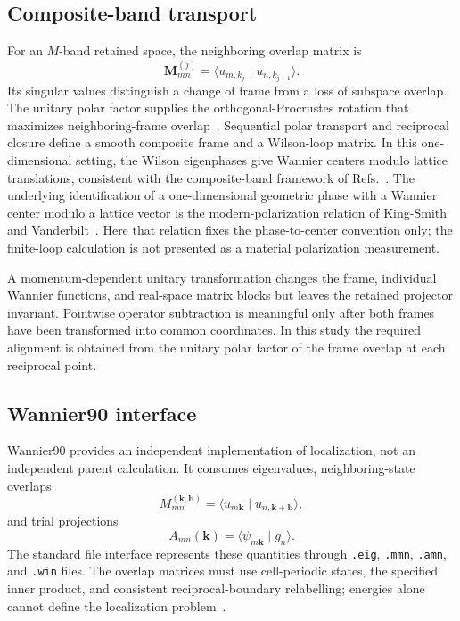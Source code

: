 \subsection{Composite-band transport}

For an $M$-band retained space, the neighboring overlap matrix is
\begin{equation}
    \mathbf M^{(j)}_{mn}
    =\langle u_{m,k_j}\mid u_{n,k_{j+1}}\rangle.
    \label{eq:periodic-1d-neighbor-overlap}
\end{equation}
Its singular values distinguish a change of frame from a loss of subspace
overlap. The unitary polar factor supplies the orthogonal-Procrustes rotation
that maximizes neighboring-frame overlap~\cite{schonemann1966}. Sequential
polar transport and reciprocal closure define a smooth composite frame and a
Wilson-loop matrix. In this one-dimensional setting, the Wilson eigenphases
give Wannier centers modulo lattice translations, consistent with the
composite-band framework of
Refs.~\cite{marzari1997,souza2001}. The underlying identification of a
one-dimensional geometric phase with a Wannier center modulo a lattice vector
is the modern-polarization relation of King-Smith and
Vanderbilt~\cite{kingsmith1993}. Here that relation fixes the phase-to-center
convention only; the finite-loop calculation is not presented as a material
polarization measurement.

A momentum-dependent unitary transformation changes the frame, individual
Wannier functions, and real-space matrix blocks but leaves the retained
projector invariant. Pointwise operator subtraction is meaningful only after
both frames have been transformed into common coordinates. In this study the
required alignment is obtained from the unitary polar factor of the frame
overlap at each reciprocal point.

\subsection{Wannier90 interface}

Wannier90 provides an independent implementation of localization, not an
independent parent calculation. It consumes eigenvalues, neighboring-state
overlaps
\begin{equation}
    M_{mn}^{(\mathbf k,\mathbf b)}
    =
    \langle u_{m\mathbf k}\mid u_{n,\mathbf k+\mathbf b}\rangle,
\end{equation}
and trial projections
\begin{equation}
    A_{mn}(\mathbf k)
    =\langle\psi_{m\mathbf k}\mid g_n\rangle.
\end{equation}
The standard file interface represents these quantities through
\texttt{.eig}, \texttt{.mmn}, \texttt{.amn}, and \texttt{.win} files. The
overlap matrices must use cell-periodic states, the specified inner product, and
consistent reciprocal-boundary relabelling; energies alone cannot define the
localization problem~\cite{souza2001,pizzi2020}.

